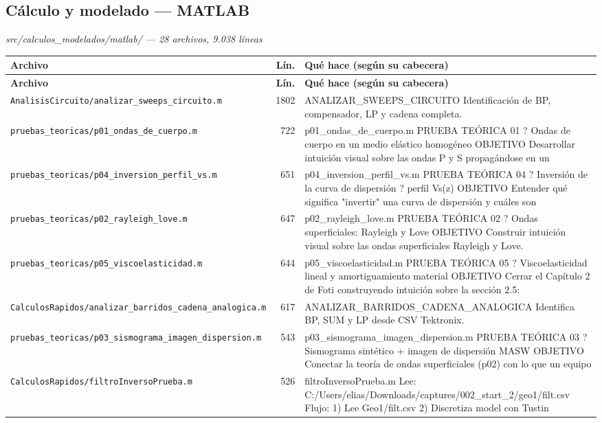 \subsection{C\'alculo y modelado --- MATLAB}
\textit{\small src/calculos\_modelados/matlab/ --- 28 archivos, 9.038 l\'ineas}
\footnotesize
\begin{longtable}{@{}p{5.4cm} r p{8.6cm}@{}}
\toprule \textbf{Archivo} & \textbf{L\'in.} & \textbf{Qu\'e hace (seg\'un su cabecera)} \\ \midrule
\endfirsthead
\toprule \textbf{Archivo} & \textbf{L\'in.} & \textbf{Qu\'e hace (seg\'un su cabecera)} \\ \midrule
\endhead
\bottomrule \endfoot
\texttt{\scriptsize AnalisisCircuito/analizar\_sweeps\_circuito.m} & 1802 & ANALIZAR\_SWEEPS\_CIRCUITO Identificación de BP, compensador, LP y cadena completa. \\
\texttt{\scriptsize pruebas\_teoricas/p01\_ondas\_de\_cuerpo.m} & 722 & p01\_ondas\_de\_cuerpo.m PRUEBA TEÓRICA 01 ? Ondas de cuerpo en un medio elástico homogéneo OBJETIVO Desarrollar intuición visual sobre las ondas P y S propagándose en un \\
\texttt{\scriptsize pruebas\_teoricas/p04\_inversion\_perfil\_vs.m} & 651 & p04\_inversion\_perfil\_vs.m PRUEBA TEÓRICA 04 ? Inversión de la curva de dispersión ? perfil Vs(z) OBJETIVO Entender qué significa "invertir" una curva de dispersión y cuáles son \\
\texttt{\scriptsize pruebas\_teoricas/p02\_rayleigh\_love.m} & 647 & p02\_rayleigh\_love.m PRUEBA TEÓRICA 02 ? Ondas superficiales: Rayleigh y Love OBJETIVO Construir intuición visual sobre las ondas superficiales Rayleigh y Love. \\
\texttt{\scriptsize pruebas\_teoricas/p05\_viscoelasticidad.m} & 644 & p05\_viscoelasticidad.m PRUEBA TEÓRICA 05 ? Viscoelasticidad lineal y amortiguamiento material OBJETIVO Cerrar el Capítulo 2 de Foti construyendo intuición sobre la sección 2.5: \\
\texttt{\scriptsize CalculosRapidos/analizar\_barridos\_cadena\_analogica.m} & 617 & ANALIZAR\_BARRIDOS\_CADENA\_ANALOGICA Identifica BP, SUM y LP desde CSV Tektronix. \\
\texttt{\scriptsize pruebas\_teoricas/p03\_sismograma\_imagen\_dispersion.m} & 543 & p03\_sismograma\_imagen\_dispersion.m PRUEBA TEÓRICA 03 ? Sismograma sintético + imagen de dispersión MASW OBJETIVO Conectar la teoría de ondas superficiales (p02) con lo que un equipo \\
\texttt{\scriptsize CalculosRapidos/filtroInversoPrueba.m} & 526 & filtroInversoPrueba.m Lee: C:/Users/elias/Downloads/captures/002\_start\_2/geo1/filt.csv Flujo: 1) Lee Geo1/filt.csv 2) Discretiza model con Tustin \\

\end{longtable}
